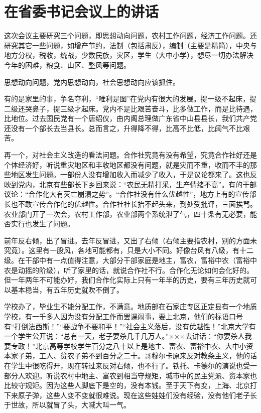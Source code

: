 \section[在省委书记会议上的讲话（一九五七年一月）]{在省委书记会议上的讲话}


这次会议主要研究三个问题，即思想动向问题，农村工作问题，经济工作问题。还研究其它一些问题，如增产节约，法制（包括肃反），编制（主要是精简），中央与地方分权，税收，统战，少数民族，灾区，学生（大中小学），想尽一切办法解决今年的困难，粮食、山区、整风等问题。

思想动向问题，党内思想动向，社会思想动向应该抓住。

有的是家里的事，争名夺利，“唯利是图”在党内有很大的发展。提一级不起床，提二级还哭鼻子，提三级才起床。党内不是比艰苦奋斗，比多做工作，而是比待遇，比地位。过去国民党有一个唐绍仪，由内阁总理做广东省中山县县长，我们共产党还没有一个部长去当县长。总而言之，升得降不得，比高不比低，比阔气不比艰苦。

再一个，对社会主义改造的看法问题。合作社究竟有没有希望，究竟合作社好还是个体经济好，听说重灾地区和丰收地区都没有问题，就是灾而不重，收而不丰的那些地区发生问题。一部份人没有增加收入而减少了收入，于是议论都来了。这也反映到党内，北京有些部长下乡回来说：“农民无精打采，生产情绪不高”。有的干部议论：“合作化大有灭亡崩溃之势”。“合作社没有什么优越性”，地方上有的宣传部长也不敢宣传合作化的优越性。合作社社长抬不起头来，到处受批评，三面挨骂。农业部门开了一次会，农村工作部，农业部两个系统泄了气，四十条有无必要，能否实行也发生了问题。

前年反右倾，出了冒进。去年反冒进，又出了右倾（右倾主要指农村，别的方面未究竟）。这里有一股风，各地可能都有，只是大小不同。好像台风有八级，有十二级。在干部中有一点值得注意，大部分干部家庭是地主，富农，富裕中农（富裕中农是动摇的阶级），听了家里的话，就说合作社不行。合作化无论如何会化好的。但一年两年不可能办好，我们合作化实际上只有一年半的历史，要有三年历史就可以基本稳当，有五年历史就吹不倒了。

学校办了，毕业生不能分配工作，不满意。地质部在石家庄专区正定县有一个地质学校，有一千多人因为没有分配工作而罢课闹事，要上北京，他们的标语口号有“打倒法西斯！”“要战争不要和平！”“社会主义落后，没有优越性！”北京大学有一个学生公开说：“总有一天，老子要杀几千几万人。”×××去讲话：“你要杀人我要专政！”北京高等学校学生百分之八十以上是地主、富农、富裕中农、大中小资本家子弟，工人、贫农子弟不到百分之二十。哥穆尔卡原来反对教条主义，他的话在学生中很吃得开，现在转过来反对右倾，也不行了。铁托、卡德尔的演说也受一部分人欢迎。听说农村中地主、富农到相当守规矩，城市中的民主党派、资本家也比较守规矩。因为这些人脚底下是空的，没有本钱。至于天下有变，上海、北京打下来原子弹，这些人变不变就很难说。现在这些娃娃们没有经验，没有他们老子长于世故，所以就冒了头，大喊大叫一气。

